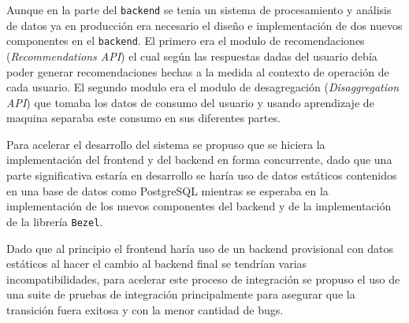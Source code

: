 Aunque en la parte del \texttt{backend} se tenia un sistema de procesamiento
y análisis de datos ya en producción era necesario el diseño e implementación
de dos nuevos componentes en el \texttt{backend}. El primero era el modulo de
recomendaciones (\textit{Recommendations API}) el cual según las respuestas
dadas del usuario debía poder generar recomendaciones hechas a la medida al
contexto de operación de cada usuario. El segundo modulo era el modulo de
desagregación (\textit{Disaggregation API}) que tomaba los datos de consumo
del usuario y usando aprendizaje de maquina separaba este consumo en sus
diferentes partes. %

Para acelerar el desarrollo del sistema se propuso que se hiciera la implementación
del frontend y del backend en forma concurrente, dado que una parte significativa
estaría en desarrollo se haría uso de datos estáticos contenidos en una base de
datos como PostgreSQL mientras se esperaba en la implementación de los nuevos
componentes del backend y de la implementación de la librería \texttt{Bezel}.

Dado que al principio el frontend haría uso de un backend provisional con datos
estáticos al hacer el cambio al backend final se tendrían varias incompatibilidades,
para acelerar este proceso de integración se propuso el uso de una suite de
pruebas de integración principalmente para asegurar que la transición fuera exitosa
y con la menor cantidad de bugs.

